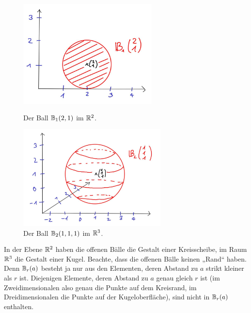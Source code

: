\begin{figure}[ht]
    \begin{minipage}{.48\textwidth}
        \includegraphics[width=7cm]{./_img/2Dball.jpeg}
        \centering \caption{Der Ball $\mathbb B_1(2,1)$ im $\mathbb R^2$.}
    \end{minipage}
    \quad
    \begin{minipage}{.48\textwidth}
        \includegraphics[width=7.5cm]{./_img/3Dball.jpeg}
        \centering \caption{Der Ball $\mathbb B_2(1,1,1)$ im $\mathbb R^3$.}
    \end{minipage}
\end{figure}


\begin{bsp}
    In der Ebene $\mathbb R^2$ haben die offenen Bälle die Gestalt einer Kreisscheibe, im Raum $\mathbb R^3$ die Gestalt einer Kugel. Beachte, dass die offenen Bälle keinen „Rand“ haben. Denn $\mathbb B_r(a)$ besteht ja nur aus den Elementen, deren Abstand zu $a$ strikt kleiner als $r$ ist. Diejenigen Elemente, deren Abstand zu $a$ genau gleich $r$ ist (im Zweidimensionalen also genau die Punkte auf dem Kreisrand, im Dreidimensionalen die Punkte auf der Kugeloberfläche), sind nicht in $\mathbb B_r(a)$ enthalten.
\end{bsp}


